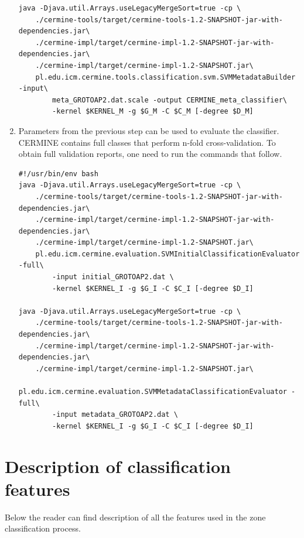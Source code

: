 \begin{appendix}
\begin{enumerate}
\begin{lstlisting}
java -Djava.util.Arrays.useLegacyMergeSort=true -cp \
    ./cermine-tools/target/cermine-tools-1.2-SNAPSHOT-jar-with-dependencies.jar\
    ./cermine-impl/target/cermine-impl-1.2-SNAPSHOT-jar-with-dependencies.jar\
    ./cermine-impl/target/cermine-impl-1.2-SNAPSHOT.jar\
    pl.edu.icm.cermine.tools.classification.svm.SVMMetadataBuilder -input\
        meta_GROTOAP2.dat.scale -output CERMINE_meta_classifier\
        -kernel $KERNEL_M -g $G_M -C $C_M [-degree $D_M]
\end{lstlisting}
\item Parameters from the previous step can be used to evaluate the classifier. CERMINE contains full classes that perform n-fold cross-validation. To obtain full validation reports, one need to run the commands that follow.
\begin{lstlisting}
#!/usr/bin/env bash
java -Djava.util.Arrays.useLegacyMergeSort=true -cp \
    ./cermine-tools/target/cermine-tools-1.2-SNAPSHOT-jar-with-dependencies.jar\
    ./cermine-impl/target/cermine-impl-1.2-SNAPSHOT-jar-with-dependencies.jar\
    ./cermine-impl/target/cermine-impl-1.2-SNAPSHOT.jar\
    pl.edu.icm.cermine.evaluation.SVMInitialClassificationEvaluator -full\
        -input initial_GROTOAP2.dat \
        -kernel $KERNEL_I -g $G_I -C $C_I [-degree $D_I]

java -Djava.util.Arrays.useLegacyMergeSort=true -cp \
    ./cermine-tools/target/cermine-tools-1.2-SNAPSHOT-jar-with-dependencies.jar\
    ./cermine-impl/target/cermine-impl-1.2-SNAPSHOT-jar-with-dependencies.jar\
    ./cermine-impl/target/cermine-impl-1.2-SNAPSHOT.jar\
    pl.edu.icm.cermine.evaluation.SVMMetadataClassificationEvaluator -full\
        -input metadata_GROTOAP2.dat \
        -kernel $KERNEL_I -g $G_I -C $C_I [-degree $D_I]
\end{lstlisting}

\end{enumerate}
\chapter{Description of classification features}
\label{appendix:features}
Below the reader can find description of all the features used in the zone classification process.


\end{appendix}
